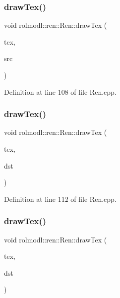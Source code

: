 \subsubsection{\texorpdfstring{drawTex()}{drawTex()}\hspace{0.1cm}{\footnotesize\ttfamily [3/36]}}
{\footnotesize\ttfamily void rolmodl\+::ren\+::\+Ren\+::draw\+Tex (\begin{DoxyParamCaption}\item[{Tex \&}]{tex,  }\item[{const \mbox{\hyperlink{structrolmodl_1_1blend_mode_1_1_src_rect_x_y}{Src\+Rect\+XY}}}]{src }\end{DoxyParamCaption})}



Definition at line 108 of file Ren.\+cpp.

\mbox{\label{classrolmodl_1_1blend_mode_1_1_ren_af39194fb9153972303237ba1ef30969b}} 
\subsubsection{\texorpdfstring{drawTex()}{drawTex()}\hspace{0.1cm}{\footnotesize\ttfamily [4/36]}}
{\footnotesize\ttfamily void rolmodl\+::ren\+::\+Ren\+::draw\+Tex (\begin{DoxyParamCaption}\item[{Tex \&}]{tex,  }\item[{const \mbox{\hyperlink{structrolmodl_1_1blend_mode_1_1_dst_rect_w_h}{Dst\+Rect\+WH}}}]{dst }\end{DoxyParamCaption})}



Definition at line 112 of file Ren.\+cpp.

\mbox{\label{classrolmodl_1_1blend_mode_1_1_ren_a01f0ba738b77b680857a86f52ddf8d40}} 
\subsubsection{\texorpdfstring{drawTex()}{drawTex()}\hspace{0.1cm}{\footnotesize\ttfamily [5/36]}}
{\footnotesize\ttfamily void rolmodl\+::ren\+::\+Ren\+::draw\+Tex (\begin{DoxyParamCaption}\item[{Tex \&}]{tex,  }\item[{const \mbox{\hyperlink{structrolmodl_1_1blend_mode_1_1_dst_rect_x_y}{Dst\+Rect\+XY}}}]{dst }\end{DoxyParamCaption})}



